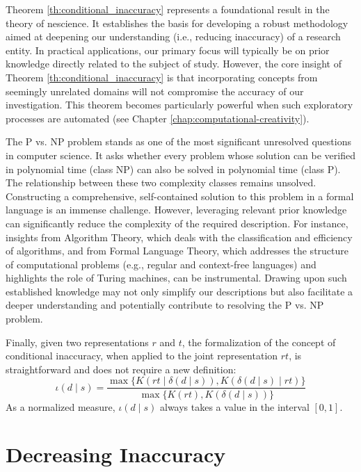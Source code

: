 Theorem \ref{th:conditional_inaccuracy} represents a foundational result in the theory of nescience. It establishes the basis for developing a robust methodology aimed at deepening our understanding (i.e., reducing inaccuracy) of a research entity. In practical applications, our primary focus will typically be on prior knowledge directly related to the subject of study. However, the core insight of Theorem \ref{th:conditional_inaccuracy} is that incorporating concepts from seemingly unrelated domains will not compromise the accuracy of our investigation. This theorem becomes particularly powerful when such exploratory processes are automated (see Chapter \ref{chap:computational-creativity}).

\begin{example}
The P vs. NP problem stands as one of the most significant unresolved questions in computer science. It asks whether every problem whose solution can be verified in polynomial time (class NP) can also be solved in polynomial time (class P). The relationship between these two complexity classes remains unsolved. Constructing a comprehensive, self-contained solution to this problem in a formal language is an immense challenge. However, leveraging relevant prior knowledge can significantly reduce the complexity of the required description. For instance, insights from Algorithm Theory, which deals with the classification and efficiency of algorithms, and from Formal Language Theory, which addresses the structure of computational problems (e.g., regular and context-free languages) and highlights the role of Turing machines, can be instrumental. Drawing upon such established knowledge may not only simplify our descriptions but also facilitate a deeper understanding and potentially contribute to resolving the P vs. NP problem.
\end{example}

Finally, given two representations $r$ and $t$, the formalization of the concept of conditional inaccuracy, when applied to the joint representation $rt$, is straightforward and does not require a new definition:
\[
\iota(d \mid s) = \frac{ \max\{ K \left(rt \mid \delta(d \mid s) \right), K \left( \delta(d \mid s) \mid rt \right) \} } { \max\{ K(rt), K \left(\delta(d \mid s) \right) \} }
\]
As a normalized measure, $\iota(d \mid s)$ always takes a value in the interval $[0, 1]$.

%
%

\section{Decreasing Inaccuracy}

